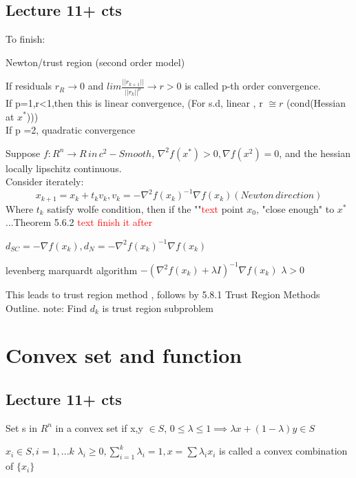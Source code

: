 \subsection{Lecture 11+ cts}
To finish:

Newton/trust region (second order model)

\begin{definition}
    If residuals $r_R\to 0$ and 
    $lim\frac{||r_{k+1}||}{||r_k||^p}\to r >0$ is called p-th order convergence.
    \\ If p=1,r<1,then this is linear convergence, (For s.d, linear , r $\cong r$ (cond(Hessian at $x^*$)))
    \\ If p =2, quadratic convergence
\end{definition}

\begin{theorem}
    Suppose $f:R^n\to R\,in\, c^2-Smooth$, $\nabla^2f(x^*)>0,\nabla f(x^2)=0$, and 
    the hessian locally lipschitz continuous.\\
    Consider iterately:
    $$x_{k+1}=x_k+t_kv_k,v_k=-\nabla^2f(x_k)^{-1}\nabla f(x_k)(Newton\,direction)$$
    Where $t_k$ satisfy wolfe condition, then  if the ""\textcolor{red}{text} point $x_0$,
    "close enough" to $x^*$ ...Theorem 5.6.2 \textcolor{red}{text finish it after}
\end{theorem}
\begin{problem}
    $d_{SC}=-\nabla f(x_k),d_N=-\nabla^2f(x_k)^{-1}\nabla f(x_k) $
\end{problem}

    levenberg marquardt algorithm
$-(\nabla^2 f(x_k)+\lambda I)^{-1}\nabla f(x_k)$ $\lambda >0$
\begin{problem}
    This leads to trust region method ,
    follows by 5.8.1 Trust Region Methods Outline.
    note: Find $d_k$ is trust region subproblem
\end{problem}


\section{Convex set and function}
\subsection{Lecture 11+ cts}

\begin{definition}
    Set s in $R^n$ in a convex set if x,y $\in S$, $0\leq \lambda \leq 1\implies\lambda x+(1-\lambda)y\in S$
    
\end{definition}
\begin{definition}
    $x_i \in S,i=1,...k$ $\lambda_i \geq 0,\sum_{i=1}^{k}\lambda_i=1,x=\sum\lambda_i x_i$ is called a convex combination of $\{x_i\}$
\end{definition}

